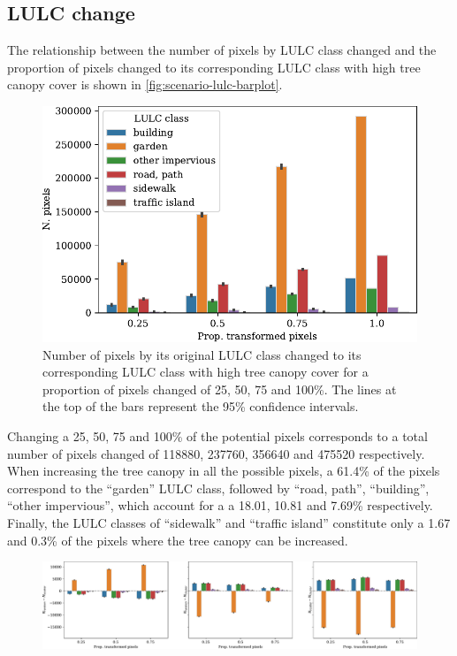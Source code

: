 \documentclass[10pt,letterpaper]{article}
\begin{document}
\subsection*{LULC change}

The relationship between the number of pixels by LULC class changed and the proportion of pixels changed to its corresponding LULC class with high tree canopy cover is shown in \autoref{fig:scenario-lulc-barplot}.
\begin{figure}
  \centering
  \includegraphics[width=.6\textwidth]{figures/scenario-lulc-barplot}%
  \caption{\label{fig:scenario-lulc-barplot} Number of pixels by its original LULC class changed to its corresponding LULC class with high tree canopy cover for a proportion of pixels changed of 25, 50, 75 and 100\%. The lines at the top of the bars represent the 95\% confidence intervals.}
\end{figure}
Changing a 25, 50, 75 and 100\% of the potential pixels corresponds to a total number of pixels changed of 118880, 237760, 356640 and 475520 respectively.
When increasing the tree canopy in all the possible pixels, a 61.4\% of the pixels correspond to the ``garden'' LULC class, followed by ``road, path'', ``building'', ``other impervious'', which account for a a 18.01, 10.81 and 7.69\% respectively. Finally, the LULC classes of ``sidewalk'' and ``traffic island'' constitute only a 1.67 and 0.3\% of the  pixels where the tree canopy can be increased.

\begin{figure}
  \begin{adjustwidth}{-.4\textwidth}{0cm}  
    \centering
    \includegraphics[width=\linewidth]{figures/scenario-lulc-barplot-comparison}
    \caption{\label{fig:scenario-lulc-barplot-comparison} }
  \end{adjustwidth}
\end{figure}
\end{document}
